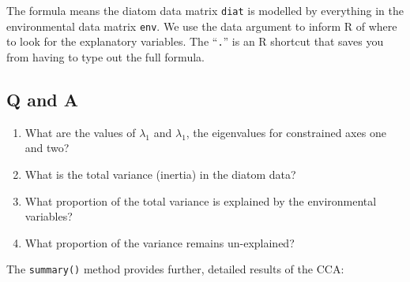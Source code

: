 \documentclass[a4paper,10pt]{article}
\newcommand{\R}{\textsf{R}\xspace}
\begin{document}
The formula means the diatom data matrix \texttt{diat} is modelled by everything in the environmental data matrix \texttt{env}. We use the data argument to inform R of where to look for the explanatory variables. The ``\texttt{.}'' is an \R shortcut that saves you from having to type out the full formula.

\subsection*{Q and A}
\begin{enumerate}
\item What are the values of $\lambda_1$ and $\lambda_1$, the eigenvalues for constrained axes one and two?
\item What is the total variance (inertia) in the diatom data?
\item What proportion of the total variance is explained by the environmental variables?
\item What proportion of the variance remains un-explained?
\end{enumerate}

The \texttt{summary()} method provides further, detailed results of the CCA:
\end{document}

